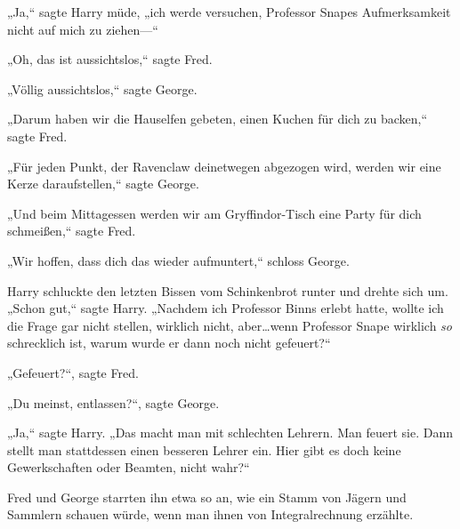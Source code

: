„Ja,“ sagte Harry müde, „ich werde versuchen, Professor Snapes Aufmerksamkeit nicht auf mich zu ziehen—“

„Oh, das ist aussichtslos,“ sagte Fred.

„Völlig aussichtslos,“ sagte George.

„Darum haben wir die Hauselfen gebeten, einen Kuchen für dich zu backen,“ sagte Fred.

„Für jeden Punkt, der Ravenclaw deinetwegen abgezogen wird, werden wir eine Kerze daraufstellen,“ sagte George.

„Und beim Mittagessen werden wir am Gryffindor-Tisch eine Party für dich schmeißen,“ sagte Fred.

„Wir hoffen, dass dich das wieder aufmuntert,“ schloss George.

Harry schluckte den letzten Bissen vom Schinkenbrot runter und drehte sich um. „Schon gut,“ sagte Harry. „Nachdem ich Professor Binns erlebt hatte, wollte ich die Frage gar nicht stellen, wirklich nicht, aber…wenn Professor Snape wirklich \emph{so} schrecklich ist, warum wurde er dann noch nicht gefeuert?“

„Gefeuert?“, sagte Fred.

„Du meinst, entlassen?“, sagte George.

„Ja,“ sagte Harry. „Das macht man mit schlechten Lehrern. Man feuert sie. Dann stellt man stattdessen einen besseren Lehrer ein. Hier gibt es doch keine Gewerkschaften oder Beamten, nicht wahr?“

Fred und George starrten ihn etwa so an, wie ein Stamm von Jägern und Sammlern schauen würde, wenn man ihnen von Integralrechnung erzählte.


